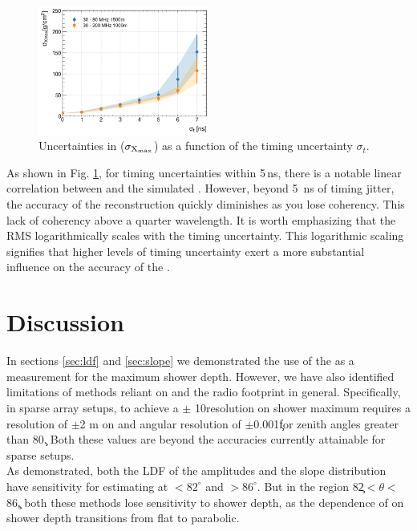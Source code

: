 \begin{figure}[ht!]
    \centering
    \includegraphics[width=0.5\textwidth]{rms_rita2.png}   
    \caption{Uncertainties in \xmax ($\rm \sigma_{X_{max}}$) as a function of the timing uncertainty $\sigma_t$.}
    \label{fig:rit_rms}
\end{figure}
As shown in Fig. \ref{fig:rit_rms}, for timing uncertainties within 5\,ns, there is a notable linear correlation between \xrit and the simulated \xmax. However, beyond 5\, ns of timing jitter, the accuracy of the reconstruction quickly diminishes as you lose coherency. This lack of coherency above a quarter wavelength. It is worth emphasizing that the RMS logarithmically scales with the timing uncertainty. This logarithmic scaling signifies that higher levels of timing uncertainty exert a more substantial influence on the accuracy of the \xrit.

\section{Discussion}\label{sec:disc}

In sections \ref {sec:ldf} and \ref{sec:slope} we demonstrated the use of the \rc as a measurement for the maximum shower depth. However, we have also identified limitations of methods reliant on \rc and the radio footprint in general. Specifically, in sparse array setups, to achieve a $\pm$ 10\gr resolution on shower maximum requires a resolution of $\pm$2 m on \rc and angular resolution of $\pm$0.001\c for zenith angles greater than 80\c. Both these values are beyond the accuracies currently attainable for sparse setups. 
\\
As demonstrated, both the LDF of the amplitudes and the slope distribution have sensitivity for estimating \xmax at \thet $< 82^\circ$ and $> 86^\circ$. But in the region 82\c$<\theta<$86\c, both these methods lose sensitivity to shower depth, as the dependence of \rc on shower depth transitions from flat to parabolic.

